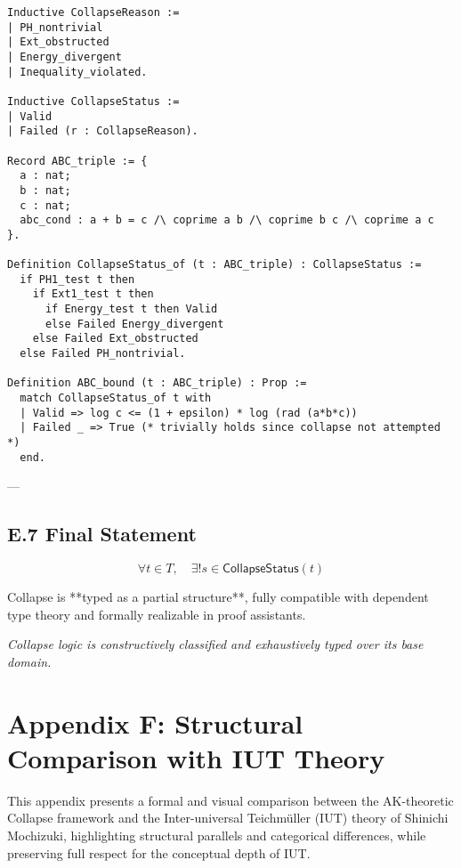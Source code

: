 \documentclass[11pt]{article}
\begin{document}
\begin{verbatim}
Inductive CollapseReason :=
| PH_nontrivial
| Ext_obstructed
| Energy_divergent
| Inequality_violated.

Inductive CollapseStatus :=
| Valid
| Failed (r : CollapseReason).

Record ABC_triple := {
  a : nat;
  b : nat;
  c : nat;
  abc_cond : a + b = c /\ coprime a b /\ coprime b c /\ coprime a c
}.

Definition CollapseStatus_of (t : ABC_triple) : CollapseStatus :=
  if PH1_test t then
    if Ext1_test t then
      if Energy_test t then Valid
      else Failed Energy_divergent
    else Failed Ext_obstructed
  else Failed PH_nontrivial.

Definition ABC_bound (t : ABC_triple) : Prop :=
  match CollapseStatus_of t with
  | Valid => log c <= (1 + epsilon) * log (rad (a*b*c))
  | Failed _ => True (* trivially holds since collapse not attempted *)
  end.
\end{verbatim}

---

\subsection*{E.7 Final Statement}

\[
\boxed{
\forall t \in T,\quad \exists! s \in \mathsf{CollapseStatus}(t)
}
\]

Collapse is **typed as a partial structure**, fully compatible with dependent type theory and formally realizable in proof assistants.

\begin{center}
\textit{Collapse logic is constructively classified and exhaustively typed over its base domain.}
\end{center}



\section*{Appendix F: Structural Comparison with IUT Theory}

This appendix presents a formal and visual comparison between the AK-theoretic Collapse framework  
and the Inter-universal Teichmüller (IUT) theory of Shinichi Mochizuki, highlighting structural parallels  
and categorical differences, while preserving full respect for the conceptual depth of IUT.
\end{document}
